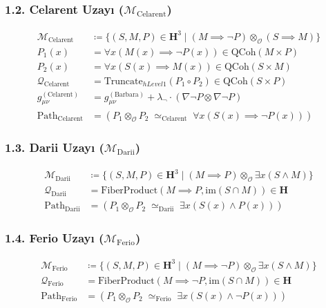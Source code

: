 \documentclass[11pt, a4paper]{article}
\begin{document}
\subsubsection{1.2. Celarent Uzayı ($\mathcal{M}_{\text{Celarent}}$)}
\begin{align}
\mathcal{M}_{\text{Celarent}} &\coloneqq \{ (S, M, P) \in \mathbf{H}^3 \mid (M \implies \neg P) \otimes_{\mathcal{O}} (S \implies M) \} \\
P_1(x) &= \forall x (M(x) \implies \neg P(x)) \in \text{QCoh}(M \times P) \\
P_2(x) &= \forall x (S(x) \implies M(x)) \in \text{QCoh}(S \times M) \\
\mathcal{Q}_{\text{Celarent}} &= \text{Truncate}_{hLevel 1}(P_1 \circ P_2) \in \text{QCoh}(S \times P) \\
g_{\mu\nu}^{(\text{Celarent})} &= g_{\mu\nu}^{(\text{Barbara})} + \lambda_{\neg} \cdot (\nabla \neg P \otimes \nabla \neg P) \\
\text{Path}_{\text{Celarent}} &= (P_1 \otimes_{\mathcal{O}} P_2 \;\simeq_{\text{Celarent}}\; \forall x (S(x) \implies \neg P(x)))
\end{align}

\subsubsection{1.3. Darii Uzayı ($\mathcal{M}_{\text{Darii}}$)}
\begin{align}
\mathcal{M}_{\text{Darii}} &\coloneqq \{ (S, M, P) \in \mathbf{H}^3 \mid (M \implies P) \otimes_{\mathcal{O}} \exists x (S \land M) \} \\
\mathcal{Q}_{\text{Darii}} &= \text{FiberProduct}(M \implies P, \text{im}(S \cap M)) \in \mathbf{H} \\
\text{Path}_{\text{Darii}} &= (P_1 \otimes_{\mathcal{O}} P_2 \;\simeq_{\text{Darii}}\; \exists x (S(x) \land P(x)))
\end{align}

\subsubsection{1.4. Ferio Uzayı ($\mathcal{M}_{\text{Ferio}}$)}
\begin{align}
\mathcal{M}_{\text{Ferio}} &\coloneqq \{ (S, M, P) \in \mathbf{H}^3 \mid (M \implies \neg P) \otimes_{\mathcal{O}} \exists x (S \land M) \} \\
\mathcal{Q}_{\text{Ferio}} &= \text{FiberProduct}(M \implies \neg P, \text{im}(S \cap M)) \in \mathbf{H} \\
\text{Path}_{\text{Ferio}} &= (P_1 \otimes_{\mathcal{O}} P_2 \;\simeq_{\text{Ferio}}\; \exists x (S(x) \land \neg P(x)))
\end{align}
\end{document}
